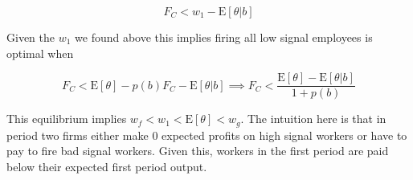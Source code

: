 \documentclass[11pt]{article}
\newcommand{\E}{\mathrm{E}}
\begin{document}
$$ F_C <  w_1 - \E[\theta|b] $$

Given the $w_1$ we found above this implies firing all low signal employees is optimal when 

$$F_C <\E[\theta] - p(b) F_C - \E[\theta |b] \implies F_C < \frac{\E[\theta] - \E[\theta|b]}{1+p(b)}$$

This equilibrium implies $w_f < w_1 < \E[\theta] < w_g$. The intuition here is that in period two firms either make 0 expected profits on high signal workers or have to pay to fire bad signal workers. Given this, workers in the first period are paid below their expected first period output. 
 




	
\end{document}
